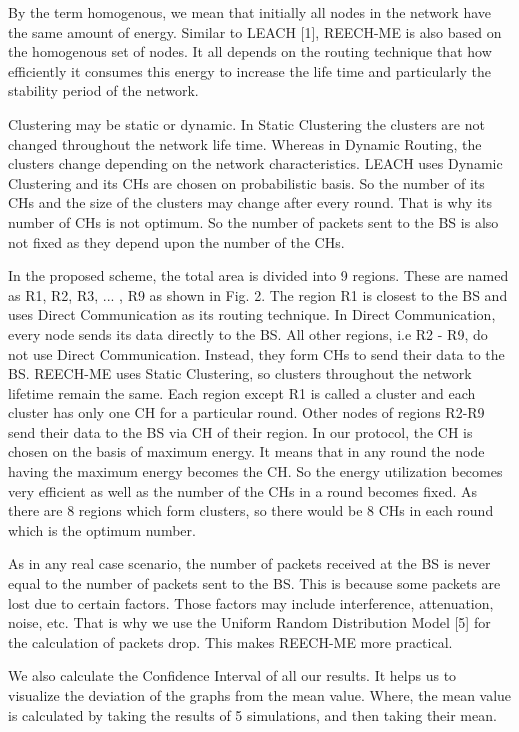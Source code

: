 \documentclass[journal]{IEEEtran}
\begin{document}
By the term homogenous, we mean that initially all nodes in the network have the same amount of energy. Similar to LEACH [1], REECH-ME is also based on the homogenous set of nodes. It all depends on the routing technique that how efficiently it consumes this energy to increase the life time and particularly the stability period of the network.

Clustering may be static or dynamic. In Static Clustering the clusters are not changed throughout the network life time. Whereas in Dynamic Routing, the clusters change depending on the network characteristics. LEACH uses Dynamic Clustering and its CHs are chosen on probabilistic basis. So the number of its CHs and the size of the clusters may change after every round. That is why its number of CHs is not optimum. So the number of packets sent to the BS is also not fixed as they depend upon the number of the CHs.

In the proposed scheme, the total area is divided into 9 regions. These are named as R1, R2, R3, ... , R9 as shown in Fig. 2. The region R1 is closest to the BS and uses Direct Communication as its routing technique. In Direct Communication, every node sends its data directly to the BS. All other regions, i.e R2 - R9, do not use Direct Communication. Instead, they form CHs to send their data to the BS. REECH-ME uses Static Clustering, so clusters throughout the network lifetime remain the same. Each region except R1 is called a cluster and each cluster has only one CH for a particular round. Other nodes of regions R2-R9 send their data to the BS via CH of their region. In our protocol, the CH is chosen on the basis of maximum energy. It means that in any round the node having the maximum energy becomes the CH. So the energy utilization becomes very efficient as well as the number of the CHs in a round becomes fixed. As there are 8 regions which form clusters, so there would be 8 CHs in each round which is the optimum number.

As in any real case scenario, the number of packets received at the BS is never equal to the number of packets sent to the BS. This is because some packets are lost due to certain factors. Those factors may include interference, attenuation, noise, etc. That is why we use the Uniform Random Distribution Model [5] for the calculation of packets drop. This makes REECH-ME more practical.

We also calculate the Confidence Interval of all our results. It helps us to visualize the deviation of the graphs from the mean value. Where, the mean value is calculated by taking the results of 5 simulations, and then taking their mean.
\end{document}
